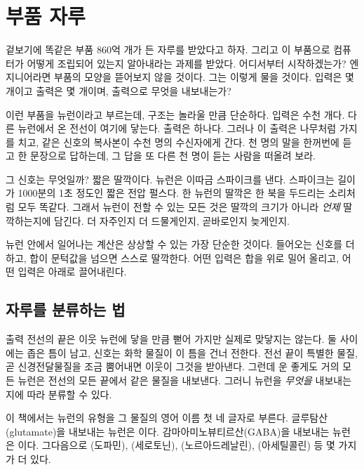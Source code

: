 \chapter{부품 자루}


겉보기에 똑같은 부품 860억 개가 든 자루를 받았다고 하자. 그리고 이 부품으로 컴퓨터가 어떻게 조립되어 있는지 알아내라는 과제를 받았다. 어디서부터 시작하겠는가? 엔지니어라면 부품의 모양을 뜯어보지 않을 것이다. 그는 이렇게 물을 것이다. 입력은 몇 개이고 출력은 몇 개이며, 출력으로 무엇을 내보내는가?

이런 부품을 뉴런이라고 부르는데, 구조는 놀라울 만큼 단순하다. 입력은 수천 개다. 다른 뉴런에서 온 전선이 여기에 닿는다. 출력은 하나다. 그러나 이 출력은 나무처럼 가지를 치고, 같은 신호의 복사본이 수천 명의 수신자에게 간다. 천 명의 말을 한꺼번에 듣고 한 문장으로 답하는데, 그 답을 또 다른 천 명이 듣는 사람을 떠올려 보라.

그 신호는 무엇일까? 짧은 딸깍이다. 뉴런은 이따금 스파이크를 낸다. 스파이크는 길이가 1000분의 1초 정도인 짧은 전압 펄스다. 한 뉴런의 딸깍은 한 북을 두드리는 소리처럼 모두 똑같다. 그래서 뉴런이 전할 수 있는 모든 것은 딸깍의 크기가 아니라 \emph{언제} 딸깍하는지에 담긴다. 더 자주인지 더 드물게인지, 곧바로인지 늦게인지.

뉴런 안에서 일어나는 계산은 상상할 수 있는 가장 단순한 것이다. 들어오는 신호를 더하고, 합이 문턱값을 넘으면 스스로 딸깍한다. 어떤 입력은 합을 위로 밀어 올리고, 어떤 입력은 아래로 끌어내린다.

\section*{자루를 분류하는 법}

출력 전선의 끝은 이웃 뉴런에 닿을 만큼 뻗어 가지만 실제로 맞닿지는 않는다. 둘 사이에는 좁은 틈이 남고, 신호는 화학 물질이 이 틈을 건너 전한다. 전선 끝이 특별한 물질, 곧 신경전달물질을 조금 뿜어내면 이웃이 그것을 받아낸다. 그런데 운 좋게도 거의 모든 뉴런은 전선의 모든 끝에서 같은 물질을 내보낸다. 그러니 뉴런을 \emph{무엇을} 내보내는지에 따라 분류할 수 있다.

이 책에서는 뉴런의 유형을 그 물질의 영어 이름 첫 네 글자로 부른다. 글루탐산(glutamate)을 내보내는 뉴런은 이다. 감마아미노뷰티르산(GABA)을 내보내는 뉴런은 이다. 그다음으로 (도파민), (세로토닌), (노르아드레날린), (아세틸콜린) 등 몇 가지가 더 있다.

